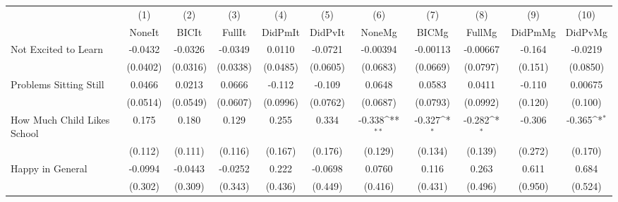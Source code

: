 {
\def\sym#1{\ifmmode^{#1}\else\(^{#1}\)\fi}
\begin{tabular}{l*{10}{c}}
\toprule
            &\multicolumn{1}{c}{(1)}&\multicolumn{1}{c}{(2)}&\multicolumn{1}{c}{(3)}&\multicolumn{1}{c}{(4)}&\multicolumn{1}{c}{(5)}&\multicolumn{1}{c}{(6)}&\multicolumn{1}{c}{(7)}&\multicolumn{1}{c}{(8)}&\multicolumn{1}{c}{(9)}&\multicolumn{1}{c}{(10)}\\
            &\multicolumn{1}{c}{NoneIt}&\multicolumn{1}{c}{BICIt}&\multicolumn{1}{c}{FullIt}&\multicolumn{1}{c}{DidPmIt}&\multicolumn{1}{c}{DidPvIt}&\multicolumn{1}{c}{NoneMg}&\multicolumn{1}{c}{BICMg}&\multicolumn{1}{c}{FullMg}&\multicolumn{1}{c}{DidPmMg}&\multicolumn{1}{c}{DidPvMg}\\
\midrule
Not Excited to Learn&     -0.0432         &     -0.0326         &     -0.0349         &      0.0110         &     -0.0721         &    -0.00394         &    -0.00113         &    -0.00667         &      -0.164         &     -0.0219         \\
            &    (0.0402)         &    (0.0316)         &    (0.0338)         &    (0.0485)         &    (0.0605)         &    (0.0683)         &    (0.0669)         &    (0.0797)         &     (0.151)         &    (0.0850)         \\
\addlinespace
Problems Sitting Still&      0.0466         &      0.0213         &      0.0666         &      -0.112         &      -0.109         &      0.0648         &      0.0583         &      0.0411         &      -0.110         &     0.00675         \\
            &    (0.0514)         &    (0.0549)         &    (0.0607)         &    (0.0996)         &    (0.0762)         &    (0.0687)         &    (0.0793)         &    (0.0992)         &     (0.120)         &     (0.100)         \\
\addlinespace
How Much Child Likes School&       0.175         &       0.180         &       0.129         &       0.255         &       0.334         &      -0.338\sym{**} &      -0.327\sym{*}  &      -0.282\sym{*}  &      -0.306         &      -0.365\sym{*}  \\
            &     (0.112)         &     (0.111)         &     (0.116)         &     (0.167)         &     (0.176)         &     (0.129)         &     (0.134)         &     (0.139)         &     (0.272)         &     (0.170)         \\
\addlinespace
Happy in General&     -0.0994         &     -0.0443         &     -0.0252         &       0.222         &     -0.0698         &      0.0760         &       0.116         &       0.263         &       0.611         &       0.684         \\
            &     (0.302)         &     (0.309)         &     (0.343)         &     (0.436)         &     (0.449)         &     (0.416)         &     (0.431)         &     (0.496)         &     (0.950)         &     (0.524)         \\
\bottomrule
\end{tabular}
}

